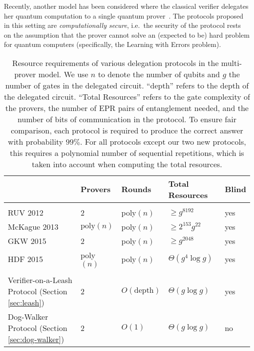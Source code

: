\documentclass[11pt]{article}
\begin{document}
Recently, another model has been considered where the classical verifier delegates her quantum computation to a single quantum prover~\cite{mahadev2018,GheorghiuV19}. The protocols proposed in this setting are {\em computationally secure}, i.e.\ the security of the protocol rests on the assumption that the prover cannot solve an (expected to be) hard problem for quantum computers (specifically, the Learning with Errors problem). 


\begin{table}[t]
\centering
\begin{tabular}{l|llll}
& Provers & Rounds & Total Resources & Blind\\
\hline\\[-8pt]
RUV 2012 \cite{reichardt2012classical}  &2 & poly$(n)$ & $\geq g^{8192}$ & yes\\[3pt]
McKague 2013 \cite{McKague16} &  $\mathrm{poly}(n)$ & poly$(n)$ & $\geq 2^{153}g^{22}$ & yes \\[3pt]
GKW 2015 \cite{Gheorghiu15} &  2 & poly$(n)$ & $\geq g^{2048}$ & yes \\[3pt]
HDF 2015 \cite{hajdusek2015} &  poly$(n)$& poly$(n)$ & $\Theta(g^4\log g)$ & yes \\[3pt]
\hline\\[-8pt]
Verifier-on-a-Leash Protocol (Section \ref{sec:leash})   & 
2 & $O(\mbox{depth})$  & $\Theta(g\log g)$ & yes \\[3pt]
Dog-Walker Protocol (Section \ref{sec:dog-walker})  & 2 & $O(1)$ & $\Theta(g\log g)$ & no 
\end{tabular}
\caption{Resource requirements of various delegation protocols in the multi-prover model. 
We use $n$ to denote the number of qubits and $g$ the number of gates in the
  delegated circuit. ``depth'' refers to the depth of the delegated circuit. ``Total Resources'' refers to the gate complexity of the
  provers, the number of EPR pairs of entanglement needed, and the number of
  bits of communication in the protocol. To ensure fair comparison, 
  each protocol is required to produce the correct answer with probability $99\%$.
  For all protocols except %
our two new protocols, this requires a
  polynomial number of sequential repetitions, which is taken into account when
  computing the total resources. %
}
\label{tab:comparison}
\end{table}
\end{document}
